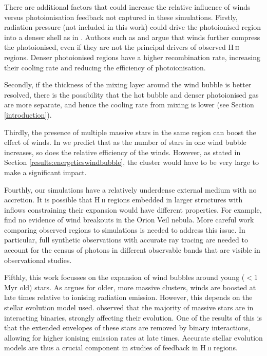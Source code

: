 \documentclass[a4paper,fleqn,usenatbib]{mnras}
\newcommand{\HII}{H$~$\textsc{ii}\xspace}
\begin{document}
There are additional factors that could increase the relative influence of winds versus photoionisation feedback not captured in these simulations. Firstly, radiation pressure (not included in this work) could drive the photoionised region into a denser shell as in \cite{Draine2011}. Authors such as \cite{Pellegrini2007} and \cite{Yeh2012} argue that winds further compress the photoionised, even if they are not the principal drivers of observed \HII regions. Denser photoionised regions have a higher recombination rate, increasing their cooling rate and reducing the efficiency of photoionisation.

Secondly, if the thickness of the mixing layer around the wind bubble is better resolved, there is the possibility that the hot bubble and denser photoionised gas are more separate, and hence the cooling rate from mixing is lower (see Section \ref{introduction}).

Thirdly, the presence of multiple massive stars in the same region can boost the effect of winds. In \cite{Geen2019} we predict that as the number of stars in one wind bubble increases, so does the relative efficiency of the winds. However, as stated in Section \ref{results:energeticswindbubble}, the cluster would have to be very large to make a significant impact.

Fourthly, our simulations have a relatively underdense external medium with no accretion. It is possible that \HII regions embedded in larger structures with inflows constraining their expansion would have different properties. For example, \cite{Pabst2019} find no evidence of wind breakouts in the Orion Veil nebula. More careful work comparing observed regions to simulations is needed to address this issue. In particular, full synthetic observations with accurate ray tracing are needed to account for the census of photons in different observable bands that are visible in observational studies.

Fifthly, this work focusses on the expansion of wind bubbles around young ($<$1 Myr old) stars. As \cite{Rahner2017} argues for older, more massive clusters, winds are boosted at late times relative to ionising radiation emission. However, this depends on the stellar evolution model used. \cite{Sana2012} observed that the majority of massive stars are in interacting binaries, strongly affecting their evolution. One of the results of this is that the extended envelopes of these stars are removed by binary interactions, allowing for higher ionising emission rates at late times. Accurate stellar evolution models are thus a crucial component in studies of feedback in \HII regions.
\end{document}
